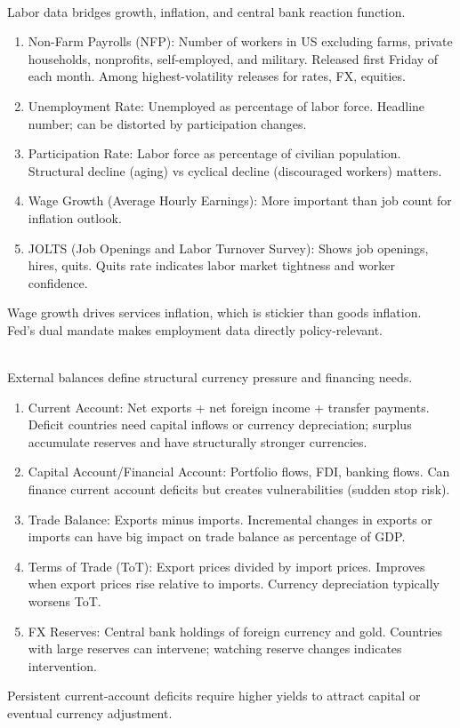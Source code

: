 \begin{remark} \\
Labor data bridges growth, inflation, and central bank reaction function.
\begin{enumerate}[label=\roman*.]
\setlength{\itemsep}{0pt}
\item Non-Farm Payrolls (NFP): Number of workers in US excluding farms, private households, nonprofits, self-employed, and military. Released first Friday of each month. Among highest-volatility releases for rates, FX, equities.
\item Unemployment Rate: Unemployed as percentage of labor force. Headline number; can be distorted by participation changes.
\item Participation Rate: Labor force as percentage of civilian population. Structural decline (aging) vs cyclical decline (discouraged workers) matters.
\item Wage Growth (Average Hourly Earnings): More important than job count for inflation outlook. 
\item JOLTS (Job Openings and Labor Turnover Survey): Shows job openings, hires, quits. Quits rate indicates labor market tightness and worker confidence.
\end{enumerate}
Wage growth drives services inflation, which is stickier than goods inflation.\\
Fed's dual mandate makes employment data directly policy-relevant.
\end{remark}

\begin{remark} \\
External balances define structural currency pressure and financing needs.
\begin{enumerate}[label=\roman*.]
\setlength{\itemsep}{0pt}
\item Current Account: Net exports + net foreign income + transfer payments. Deficit countries need capital inflows or currency depreciation; surplus accumulate reserves and have structurally stronger currencies.
\item Capital Account/Financial Account: Portfolio flows, FDI, banking flows. Can finance current account deficits but creates vulnerabilities (sudden stop risk).
\item Trade Balance: Exports minus imports. Incremental changes in exports or imports can have big impact on trade balance as percentage of GDP.
\item Terms of Trade (ToT): Export prices divided by import prices. Improves when export prices rise relative to imports. Currency depreciation typically worsens ToT.
\item FX Reserves: Central bank holdings of foreign currency and gold. Countries with large reserves can intervene; watching reserve changes indicates intervention.
\end{enumerate}
Persistent current-account deficits require higher yields to attract capital or eventual currency adjustment.
\end{remark}

